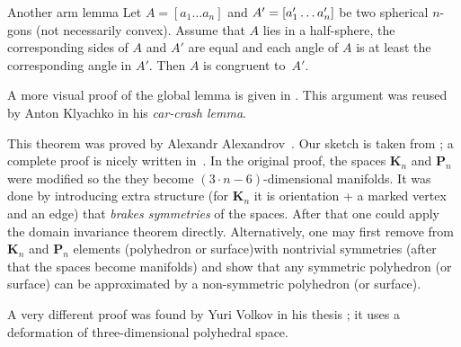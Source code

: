 \begin{thm}{Another arm lemma}
Let $A=[a_1\dots a_n]$ and $A'\z=[a'_1\z\dots a'_n]$ be two spherical $n$-gons (not necessarily convex).
Assume that $A$ lies in a half-sphere,
the corresponding sides of $A$ and $A'$ are equal
and each angle of $A$ is at least the corresponding angle in $A'$.
Then $A$ is congruent to~$A'$. 
\end{thm}

A more visual proof of the global lemma is given in \cite[II \S 1.3]{alexandrov}.
This argument was reused by Anton Klyachko \cite{klyachko} in his \emph{car-crash lemma}.

This theorem was proved by Alexandr Alexandrov~\cite{alexandrov-1941}.
Our sketch is taken from \cite{lebedeva-petrunin};
a complete proof is nicely written in~\cite{alexandrov}.
In the original proof, the spaces $\mathbf{K}_n$ and $\mathbf{P}_n$ were modified so the they become $(3\cdot n-6)$-dimensional manifolds.
It was done by introducing extra structure (for $\mathbf{K}_n$ it is orientation + a marked vertex and an edge) that \textit{brakes symmetries} of the spaces.
After that one could apply the domain invariance theorem directly.
Alternatively, one may first remove from $\mathbf{K}_n$ and $\mathbf{P}_n$ elements (polyhedron or surface)with nontrivial symmetries (after that the spaces become manifolds) and show that any symmetric polyhedron (or surface) can be approximated by a non-symmetric polyhedron (or surface).

A very different proof was found by Yuri Volkov in his thesis \cite{volkov};
it uses a deformation of three-dimensional polyhedral space.

